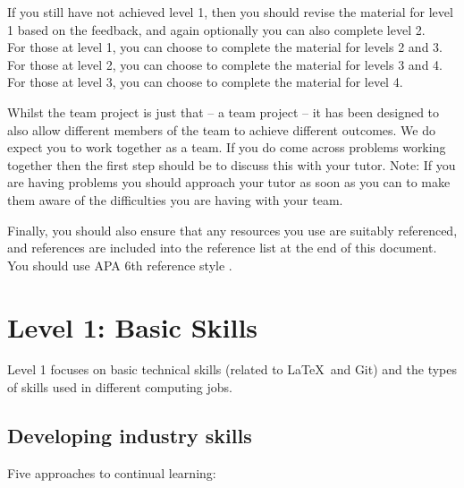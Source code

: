 \documentclass[a4paper, 11pt]{report}
\begin{document}
\begin{itemize}
    If you still have not achieved level 1, then you should revise the material for level 1 based on the feedback, and again optionally you can also complete level 2.\\
    For those at level 1, you can choose to complete the material for levels 2 and 3.\\
    For those at level 2, you can choose to complete the material for levels 3 and 4.\\
    For those at level 3, you can choose to complete the material for level 4.
\end{itemize}

Whilst the team project is just that -- a team project -- it has been designed to also allow different members of the team to achieve different outcomes. We do expect you to work together as a team. If you do come across problems working together then the first step should be to discuss this with your tutor. Note: If you are having problems you should approach your tutor as soon as you can to make them aware of the difficulties you are having with your team.

Finally, you should also ensure that any resources you use are suitably referenced, and references are included into the reference list at the end of this document. You should use APA 6th reference style \cite{apa6}.


\newpage
\section{Level 1: Basic Skills}

Level 1 focuses on basic technical skills (related to \LaTeX\ and Git) and the types of skills used in different computing jobs.

\subsection{Developing industry skills}

Five approaches to continual learning:
\end{document}

